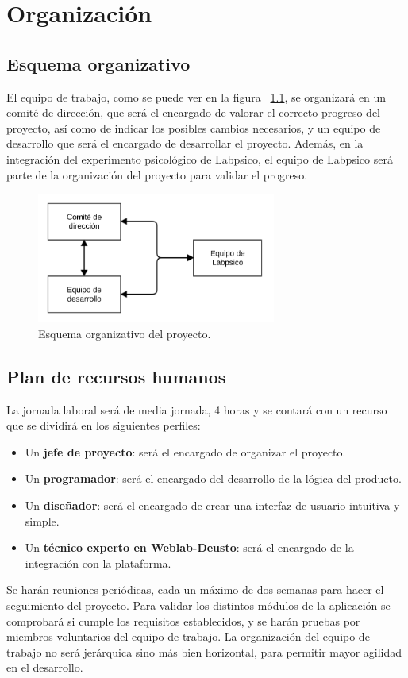 \chapter{Organización}

\section{Esquema organizativo}

El equipo de trabajo, como se puede ver en la figura ~\ref{fig:org}, se organizará en un comité de
dirección, que será el encargado de valorar el correcto progreso del proyecto, así como de indicar
los posibles cambios necesarios, y un equipo de desarrollo que será el encargado de desarrollar el
proyecto. Además, en la integración del experimento psicológico de Labpsico, el equipo de Labpsico
será parte de la organización del proyecto para validar el progreso.

\begin{figure}[h]
	\centering
	\includegraphics[width=0.7\textwidth]{fig/organizacion}
	\caption{Esquema organizativo del proyecto.}\label{fig:org}
\end{figure}

\section{Plan de recursos humanos}

La jornada laboral será de media jornada, 4 horas y se contará con un recurso que se dividirá en los
siguientes perfiles:

\begin{itemize}
\item Un \textbf{jefe de proyecto}: será el encargado de organizar el proyecto.

\item Un \textbf{programador}: será el encargado del desarrollo de la lógica del producto.

\item Un \textbf{diseñador}: será el encargado de crear una interfaz de usuario intuitiva y simple.

\item Un \textbf{técnico experto en Weblab-Deusto}: será el encargado de la integración con la
plataforma.
\end{itemize}

Se harán reuniones periódicas, cada un máximo de dos semanas para hacer el seguimiento del proyecto.
Para validar los distintos módulos de la aplicación se comprobará si cumple los requisitos
establecidos, y se harán pruebas por miembros voluntarios del equipo de trabajo. La organización del
equipo de trabajo no será jerárquica sino más bien horizontal, para permitir mayor agilidad en el
desarrollo.
